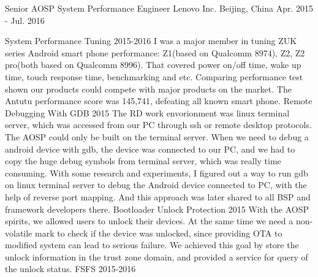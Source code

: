 

\begin{cventries}

  \cventry
    {Senior AOSP System Performance Engineer} %
    {Lenovo Inc.} %
    {Beijing, China} %
    {Apr. 2015 - Jul. 2016} %
    {
      \begin{cvsubentries} %
        \cvsubentry
          {}
          {System Performance Tuning}
          {2015-2016}
          {I was a major member in tuning ZUK series Android smart phone performance: Z1(based on Qualcomm 8974), Z2, Z2 pro(both based on Qualcomm 8996). That covered power on/off time, wake up time, touch response time, benchmarking and etc. Comparing performance test shown our products could compete with major products on the market. The Antutu performance score was 145,741, defeating all known smart phone.}
        \cvsubentry
          {}
          {Remote Debugging With GDB}
          {2015}
          {The RD work envorionment was linux terminal server, which was accessed from our PC through ssh or remote desktop protocols. The AOSP could only be built on the terminal server. When we need to debug a android device with gdb, the device was connected to our PC, and we had to copy the huge debug symbols from terminal server, which was really time consuming. With some research and experiments, I figured out a way to run gdb on linux terminal server to debug the Android device connected to PC, with the help of reverse port mapping. And this approach was later shared to all BSP and framework developers there.}
        \cvsubentry
          {}
          {Bootloader Unlock Protection}
          {2015}
          {With the AOSP spirits, we allowed users to unlock their devices. At the same time we need a non-volatile mark to check if the device was unlocked, since providing OTA to modified system can lead to serious failure. We achieved this goal by store the unlock information in the trust zone domain, and provided a service for query of the unlock status.}
        \cvsubentry
          {}
          {FSFS}
          {2015-2016}

\end{cvsubentries}}
\end{cventries}
